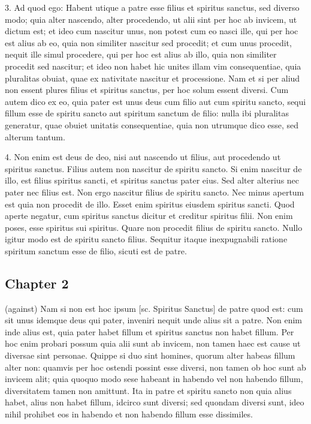 3. Ad quod ego: Habent utique a patre esse filius et spiritus sanctus, sed diverso modo; quia alter nascendo, alter procedendo, ut alii sint per hoc ab invicem, ut dictum est; et ideo cum nascitur unus, non potest cum eo nasci ille, qui per hoc est alius ab eo, quia non similiter nascitur sed procedit; et cum unus procedit, nequit ille simul procedere, qui per hoc est alius ab illo, quia non similiter procedit sed nascitur; et ideo non habet hic unites illam vim consequentiae, quia pluralitas obuiat, quae ex nativitate nascitur et processione. Nam et si per aliud non essent plures filius et spiritus sanctus, per hoc solum essent diversi. Cum autem dico ex eo, quia pater est unus deus cum filio aut cum spiritu sancto, sequi fillum esse de spiritu sancto aut spiritum sanctum de filio: nulla ibi pluralitas generatur, quae obuiet unitatis consequentiae, quia non utrumque dico esse, sed alterum tantum.

4. Non enim est deus de deo, nisi aut nascendo ut filius, aut procedendo ut spiritus sanctus. Filius autem non nascitur de spiritu sancto. Si enim nascitur de illo, est filius spiritus sancti, et spiritus sanctus pater eius. Sed alter alterius nec pater nec filius est. Non ergo nascitur filius de spiritu sancto. Nec minus apertum est quia non procedit de illo. Esset enim spiritus eiusdem spiritus sancti. Quod aperte negatur, cum spiritus sanctus dicitur et creditur spiritus filii. Non enim poses, esse spiritus sui spiritus. Quare non procedit filius de spiritu sancto. Nullo igitur modo est de spiritu sancto filius. Sequitur itaque inexpugnabili ratione spiritum sanctum esse de filio, sicuti est de patre.
\subsection{Chapter 2}
(against)
Nam si non est hoc ipsum [sc. Spiritus Sanctus] de patre quod est: cum sit unus idemque deus qui pater, inveniri nequit unde alius sit a patre. Non enim inde alius est, quia pater habet fillum et spiritus sanctus non habet fillum. Per hoc enim probari possum quia alii sunt ab invicem, non tamen haec est cause ut diversae sint personae. Quippe si duo sint homines, quorum alter habeas fillum alter non: quamvis per hoc ostendi possint esse diversi, non tamen ob hoc sunt ab invicem alit; quia quoquo modo sese habeant in habendo vel non habendo fillum, diversitatem tamen non amittunt. Ita in patre et spiritu sancto non quia alius habet, alius non habet fillum, idcirco sunt diversi; sed quondam diversi sunt, ideo nihil prohibet eos in habendo et non habendo fillum esse dissimiles.

